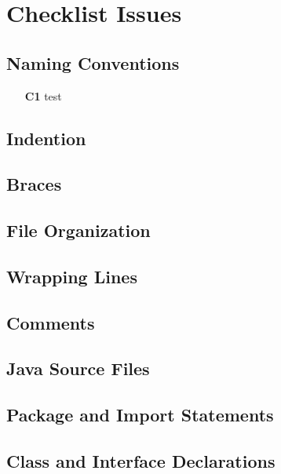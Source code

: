 \section{Checklist Issues}

\subsection{Naming Conventions}
	\begin{itemize}
		\item[\textbf{C1}] test
	\end{itemize}

\subsection{Indention}
\blindtext

\subsection{Braces}
\blindtext

\subsection{File Organization}
\blindtext

\subsection{Wrapping Lines}
\blindtext

\subsection{Comments}
\blindtext

\subsection{Java Source Files}
\blindtext

\subsection{Package and Import Statements}
\blindtext

\subsection{Class and Interface Declarations}
\blindtext

